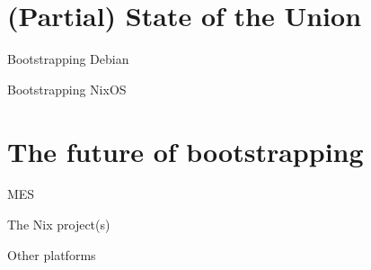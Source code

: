 \documentclass[12pt]{beamer}
\begin{document}
  \section{(Partial) State of the Union}

  \begin{frame}{Bootstrapping Debian}

  \end{frame}

  \begin{frame}{Bootstrapping NixOS}

  \end{frame}

  \section{The future of bootstrapping}

  \begin{frame}{MES}
  \end{frame}

  \begin{frame}{The Nix project(s)}
  \end{frame}

  \begin{frame}{Other platforms}

  \end{frame}
\end{document}
